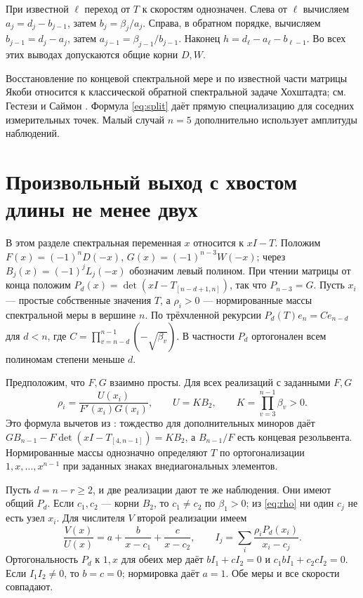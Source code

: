 \documentclass[11pt,a4paper]{article}
\begin{document}
При известной \(\ell\) переход от \(T\) к скоростям однозначен. Слева от \(\ell\) вычисляем \(a_j=d_j-b_{j-1}\), затем \(b_j=\beta_j/a_j\). Справа, в обратном порядке, вычисляем \(b_{j-1}=d_j-a_j\), затем \(a_{j-1}=\beta_{j-1}/b_{j-1}\). Наконец \(h=d_\ell-a_\ell-b_{\ell-1}\). Во всех этих выводах допускаются общие корни \(D,W\).

Восстановление по концевой спектральной мере и по известной части матрицы Якоби относится к классической обратной спектральной задаче Хохштадта; см. Гестези и Саймон \cite[теорема 4.2]{gs}. Формула \eqref{eq:split} даёт прямую специализацию для соседних измерительных точек. Малый случай \(n=5\) дополнительно использует амплитуды наблюдений.

\newpage
\section{Произвольный выход с хвостом длины не менее двух}
В этом разделе спектральная переменная \(x\) относится к \(xI-T\).
Положим \(F(x)=(-1)^nD(-x)\), \(G(x)=(-1)^{n-3}W(-x)\);
через \(B_j(x)=(-1)^jL_j(-x)\) обозначим левый полином. При чтении матрицы от конца положим \(P_d(x)=\det(xI-T_{[n-d+1,n]})\), так что \(P_{n-3}=G\). Пусть \(x_i\) --- простые собственные значения \(T\), а \(\rho_i>0\) --- нормированные массы спектральной меры в вершине \(n\). По трёхчленной рекурсии \(P_d(T)e_n=C e_{n-d}\) для \(d<n\), где \(C=\prod_{v=n-d}^{n-1}(-\sqrt{\beta_v})\). В частности \(P_d\) ортогонален всем полиномам степени меньше \(d\).

Предположим, что \(F,G\) взаимно просты. Для всех реализаций с заданными \(F,G\)
\begin{equation}\label{eq:rho}
 \rho_i=\frac{U(x_i)}{F'(x_i)G(x_i)},\qquad U=K B_2,\qquad
 K=\prod_{v=3}^{n-1}\beta_v>0 .
\end{equation}
Это формула вычетов из \cite[§3]{v2}: тождество для дополнительных миноров даёт \(G B_{n-1}-F\det(xI-T_{[4,n-1]})=K B_2\), а \(B_{n-1}/F\) есть концевая резольвента. Нормированные массы однозначно определяют \(T\) по ортогонализации \(1,x,\ldots,x^{n-1}\) при заданных знаках внедиагональных элементов.

Пусть \(d=n-r\ge2\), и две реализации дают те же наблюдения. Они имеют общий \(P_d\). Если \(c_1,c_2\) --- корни \(B_2\), то \(c_1\ne c_2\) по \(\beta_1>0\); из \eqref{eq:rho} ни один \(c_j\) не есть узел \(x_i\). Для числителя \(V\) второй реализации имеем
\[
 \frac{V(x)}{U(x)}=a+\frac{b}{x-c_1}+\frac{c}{x-c_2},\qquad
 I_j=\sum_i\frac{\rho_iP_d(x_i)}{x_i-c_j}.
\]
Ортогональность \(P_d\) к \(1,x\) для обеих мер даёт \(bI_1+cI_2=0\) и \(c_1 bI_1+c_2 cI_2=0\). Если \(I_1I_2\ne0\), то \(b=c=0\); нормировка даёт \(a=1\). Обе меры и все скорости совпадают.
\end{document}
